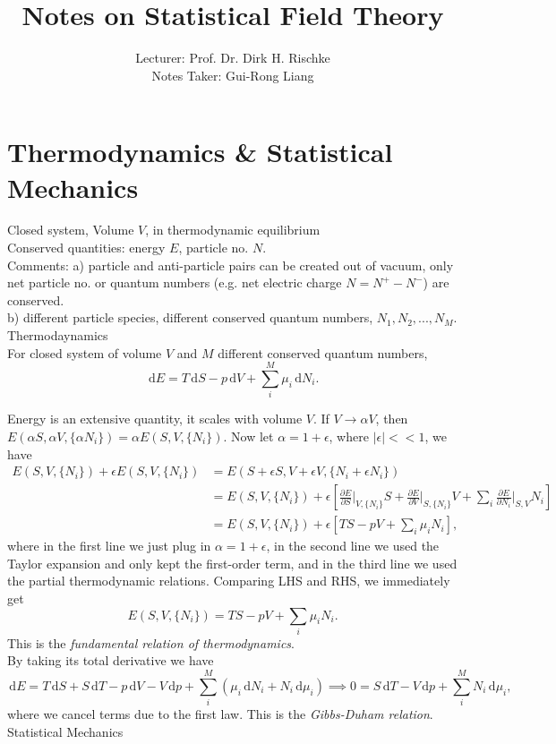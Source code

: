 \documentclass{article}
\title{Notes on Statistical Field Theory}
\author{Lecturer: Prof. Dr. Dirk H. Rischke\\Notes Taker: Gui-Rong Liang}
\newcommand{\sect}{\section}
\newcommand{\be}{\begin{equation}}
\newcommand{\ee}{\end{equation}}
\newcommand{\bs}{\be\begin{split}}
\newcommand{\dif}{\,\mathrm{d}}
\newcommand{\p}{\partial}
\newcommand{\1}{\left}
\newcommand{\2}{\right}
\newcommand{\m}{\mu}
\newcommand{\al}{\alpha}
\newcommand{\ep}{\epsilon}
\begin{document}
\maketitle
\tableofcontents

\newpage

\sect{Thermodynamics \& Statistical Mechanics}
Closed system, Volume $V$, in thermodynamic equilibrium\\
Conserved quantities: energy $E$, particle no. $N$.\\
Comments: a) particle and anti-particle pairs can be created out of vacuum, only net particle no. or quantum numbers (e.g. net electric charge $N=N^+-N^-$) are conserved.\\
b) different particle species, different conserved quantum numbers, $N_1, N_2, ..., N_M$.\\

Thermodaynamics\\

For closed system of volume $V$ and $M$ different conserved quantum numbers,
\be
\dif E=T\dif S-p\dif V+\sum_i^M\m_i \dif N_i.
\ee

Energy is an extensive quantity, it scales with volume $V$. If $V\rightarrow \al V$, then $E(\al S, \al V, \{\al N_i\})=\al E(S, V, \{N_i\})$. Now let $\al=1+\ep$, where $|\ep|<<1$, we have
\bs
E(S, V, \{N_i\})+\ep E(S, V, \{N_i\}) &=E(S+\ep S, V+\ep V, \{N_i+\ep N_i\})\\
&=E(S, V, \{N_i\})+\ep\1[\frac{\p E}{\p S}\bigg|_{V,\{N_i\}}S+\frac{\p E}{\p V}\bigg|_{S,\{N_i\}}V+\sum_i\frac{\p E}{\p N_i}\bigg|_{S,V}N_i\2]\\
&=E(S, V, \{N_i\})+\ep\1[TS-pV+\sum_i\m_iN_i\2],
\end{split}\ee
where in the first line we just plug in $\al=1+\ep$, in the second line we used the Taylor expansion and only kept the first-order term, and in the third line we used the partial thermodynamic relations. Comparing LHS and RHS, we immediately get
\be
E(S, V, \{N_i\})=TS-pV+\sum_i\m_iN_i.
\ee
This is the \textit{fundamental relation of thermodynamics}.\\
By taking its total derivative we have
\be
\dif E=T\dif S+S\dif T-p\dif V-V\dif p+\sum_i^M(\m_i \dif N_i+N_i\dif \m_i) \implies 0= S\dif T-V\dif p+\sum_i^M N_i\dif \m_i,
\ee
where we cancel terms due to the first law. This is the \textit{Gibbs-Duham relation}.\\

Statistical Mechanics\\
\end{document}
